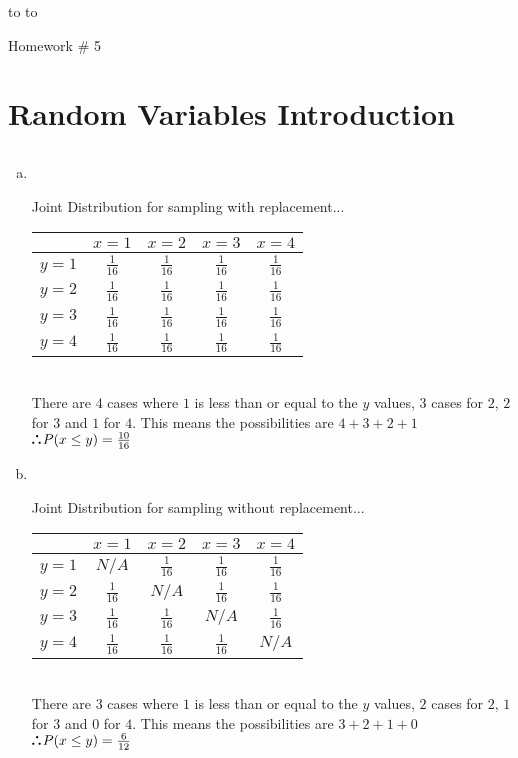 \documentclass[10pt]{report}
\newcommand{\handout}{
   \renewcommand{\thepage}{}
   \noindent
   \begin{center}
      \vbox{
    \hbox to \columnwidth {\sc{\course} --- \prof \hfill}
    \vspace{-2mm}
    \hbox to \columnwidth {\sc due \MakeLowercase{\duedate} \duelocation \hfill {\LARGE\color{mdb}\yourid}}
      }
   \end{center}
      Homework \# 5
   \vspace*{2mm}
}
\def\therefore{\boldsymbol{\text{ }
\leavevmode
\lower0.4ex\hbox{$\cdot$}
\kern-.5em\raise0.7ex\hbox{$\cdot$}
\kern-0.6em\lower0.4ex\hbox{$\cdot$}
\thinspace\text{ }}}
\begin{document}
\thispagestyle{empty}
\handout

\setcounter{chapter}{3} 
\setcounter{section}{0}
\section{\sc\color{cit}Random Variables Introduction}
\setcounter{subsection}{1}
\subsection{}
 \begin{enumerate}[(a)]
        \item \ \\
        \begin{center}
        Joint Distribution for sampling with replacement...
 \begin{tabular}{|c| c|c |c |c|} 
 \hline
  & $x=1$ & $x=2$ & $x=3$ & $x=4$ \\
 \hline
 $y=1$ & $\frac{1}{16}$ & $\frac{1}{16}$& $\frac{1}{16}$& $\frac{1}{16}$\\ 
 \hline
 $y=2$ & $\frac{1}{16}$& $\frac{1}{16}$& $\frac{1}{16}$& $\frac{1}{16}$\\
 \hline
 $y=3$& $\frac{1}{16}$& $\frac{1}{16}$& $\frac{1}{16}$& $\frac{1}{16}$ \\
 \hline
 $y=4$ & $\frac{1}{16}$& $\frac{1}{16}$& $\frac{1}{16}$& $\frac{1}{16}$ \\
 \hline
\end{tabular}\ \\
	There are $4 $ cases where $1 $ is less than or equal to the $y$ values, $3 $ cases for $2 $, $2 $ for $3$ and $1 $ for $4$. This means the possibilities are $4 + 3 + 2 + 1$\\
 $\therefore P(x \leq y) = \frac{10}{16} $
\end{center}
        \item \ \\   
                \begin{center}
        Joint Distribution for sampling without replacement...
 \begin{tabular}{|c| c|c |c |c|} 
 \hline
  & $x=1$ & $x=2$ & $x=3$ & $x=4$ \\
 \hline
 $y=1$ & $N/A$ & $\frac{1}{16}$& $\frac{1}{16}$& $\frac{1}{16}$\\ 
 \hline
 $y=2$ & $\frac{1}{16}$& $N/A$& $\frac{1}{16}$& $\frac{1}{16}$\\
 \hline
 $y=3$& $\frac{1}{16}$& $\frac{1}{16}$& $N/A$& $\frac{1}{16}$ \\
 \hline
 $y=4$ & $\frac{1}{16}$& $\frac{1}{16}$& $\frac{1}{16}$& $N/A$ \\
 \hline
\end{tabular}\ \\
	There are $3 $ cases where $1 $ is less than or equal to the $y$ values, $2$ cases for $2 $, $1$ for $3$ and $0 $ for $4$. This means the possibilities are $3 + 2 + 1 + 0$\\
 $\therefore P(x \leq y) = \frac{6}{12} $
 \end{center}
    \end{enumerate}
\end{document}
